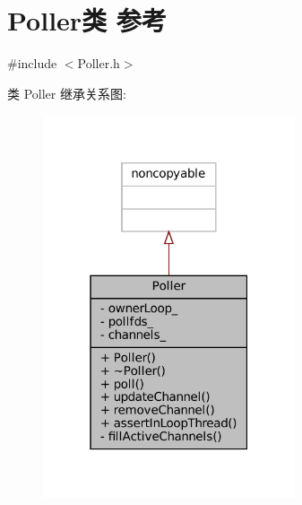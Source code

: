 \hypertarget{classmuduo_1_1Poller}{}\section{Poller类 参考}
\label{classmuduo_1_1Poller}


{\ttfamily \#include $<$Poller.\+h$>$}



类 Poller 继承关系图\+:
\nopagebreak
\begin{figure}[H]
\begin{center}
\leavevmode
\includegraphics[width=211pt]{classmuduo_1_1Poller__inherit__graph}
\end{center}
\end{figure}


